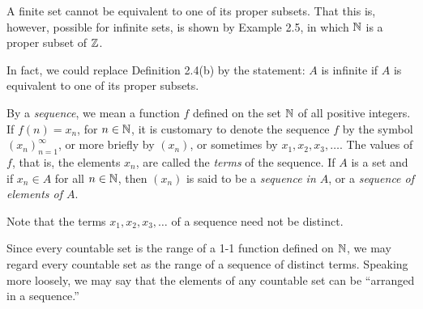 \begin{center}
\end{center}

A finite set cannot be equivalent to one of its proper subsets. That this is,
however, possible for infinite sets, is shown by Example 2.5, in which $\mathbb{N}$ is
a proper subset of $\mathbb{Z}$.

In fact, we could replace Definition 2.4(b) by the statement: $A$ is infinite
if $A$ is equivalent to one of its proper subsets.

By a \emph{sequence}, we mean a function $f$ defined on the set $\mathbb{N}$ of all
positive integers. If $f(n) = x_n$, for $n \in \mathbb{N}$, it is customary to denote
the sequence $f$ by the symbol $(x_n)_{n=1}^\infty$, or more briefly by
$(x_n)$, or sometimes by $x_1, x_2, x_3, \dots$. The values of $f$, that is,
the elements $x_n$, are called the \emph{terms} of the sequence. If $A$ is a
set and if $x_n \in A$ for all $n \in \mathbb{N}$, then $(x_n)$ is said to be a
\emph{sequence in $A$}, or a \emph{sequence of elements of $A$}.

Note that the terms $x_1, x_2, x_3, \dots$ of a sequence need not be
distinct.

Since every countable set is the range of a 1-1 function defined on $\mathbb{N}$, we
may regard every countable set as the range of a sequence of distinct terms.
Speaking more loosely, we may say that the elements of any countable set can be
``arranged in a sequence.''

